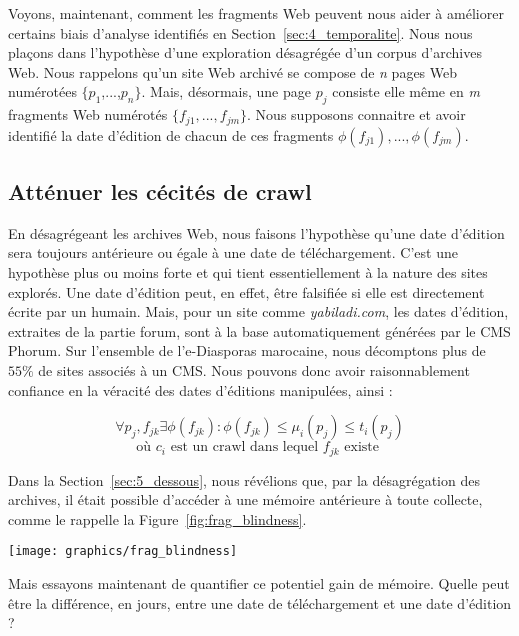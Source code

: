 \documentclass[symmetric,justified,marginals=raggedouter]{tufte-book}
\begin{document}
\noindent Voyons, maintenant, comment les fragments Web peuvent nous aider à améliorer certains biais d'analyse identifiés en Section~\ref{sec:4_temporalite}. Nous nous plaçons dans l'hypothèse d'une exploration désagrégée d'un corpus d'archives Web. Nous rappelons qu'un site Web archivé se compose de \textit{n} pages Web numérotées $\{p_1$,...,$p_n\}$. Mais, désormais, une page $p_j$ consiste elle même en \textit{m} fragments Web numérotés $\{f_{j1},...,f_{jm}\}$. Nous supposons connaitre et avoir identifié la date d'édition de chacun de ces fragments $\phi(f_{j1}),...,\phi(f_{jm})$.

\subsection{Atténuer les cécités de crawl}

\noindent En désagrégeant les archives Web, nous faisons l'hypothèse qu'une date d'édition sera toujours antérieure ou égale à une date de téléchargement. C'est une hypothèse plus ou moins forte et qui tient essentiellement à la nature des sites explorés. Une date d'édition peut, en effet, être falsifiée si elle est directement écrite par un humain. Mais, pour un site comme \textit{yabiladi.com}, les dates d'édition, extraites de la partie forum, sont à la base automatiquement générées par le CMS Phorum. Sur l'ensemble de l'e-Diasporas marocaine, nous décomptons plus de $55\%$ de sites associés à un CMS. Nous pouvons donc avoir raisonnablement confiance en la véracité des dates d'éditions manipulées, ainsi :

\[
	\forall p_j,f_{jk} \exists \phi(f_{jk}) : \phi(f_{jk}) \leq \mu_i(p_j) \leq t_i(p_j)
\] 
\[
	\textrm{où } c_i \textrm{ est un crawl dans lequel } f_{jk} \textrm{ existe   }
\]

\noindent Dans la Section~\ref{sec:5_dessous}, nous révélions que, par la désagrégation des archives, il était possible d'accéder à une mémoire antérieure à toute collecte, comme le rappelle la Figure~\ref{fig:frag_blindness}. 

\newpage

\begin{figure*}%
  \texttt{[image: graphics/frag\_blindness]}
  \caption{La fragmentation de la page $p_1$ permet d'accéder à des éléments antérieurs à la date de collecte $t_1(p_1)$}
  \label{fig:frag_blindness}
\end{figure*}

\noindent Mais essayons maintenant de quantifier ce potentiel gain de mémoire. Quelle peut être la différence, en jours, entre une date de téléchargement et une date d'édition ? 
\end{document}
